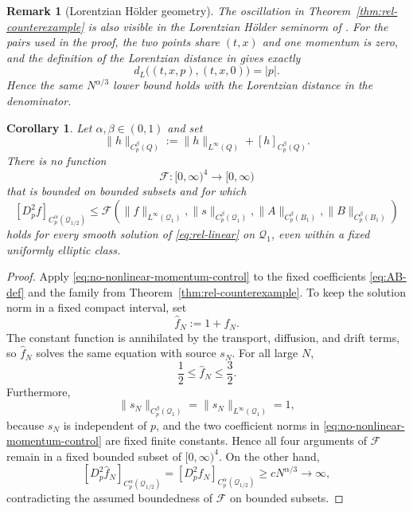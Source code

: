 \documentclass[10pt,a4paper]{amsart}
\numberwithin{equation}{section}
\newtheorem{corollary}[theorem]{Corollary}
\newtheorem{remark}[theorem]{Remark}
\begin{document}
\begin{remark}[Lorentzian H\"older geometry]\label{rem:lorentz}
The oscillation in Theorem~\ref{thm:rel-counterexample} is also visible in the Lorentzian H\"older seminorm of \cite{HSTT}.  For the pairs used in the proof, the two points share $(t,x)$ and one momentum is zero, and the definition of the Lorentzian distance in \cite[(5.6)]{HSTT} gives exactly
\[
   d_L\bigl((t,x,p),(t,x,0)\bigr)=|p|.
\]
Hence the same $N^{\alpha/3}$ lower bound holds with the Lorentzian distance in the denominator.
\end{remark}

\begin{corollary}\label{cor:no-momentum-only-nonlinear-control}
Let $\alpha,\beta\in(0,1)$ and set
\[
   \|h\|_{C_p^\beta(Q)}:=\|h\|_{L^\infty(Q)}+[h]_{C_p^\beta(Q)}.
\]
There is no function
\[
   \mathcal F:[0,\infty)^4\longrightarrow[0,\infty)
\]
that is bounded on bounded subsets and for which
\begin{equation}\label{eq:no-nonlinear-momentum-control}
   [D_p^2f]_{C_p^\alpha(\mathcal Q_{1/2})}
   \le
   \mathcal F\!\left(
      \|f\|_{L^\infty(\mathcal Q_1)},
      \|s\|_{C_p^\beta(\mathcal Q_1)},
      \|A\|_{C_p^\beta(B_1)},
      \|B\|_{C_p^\beta(B_1)}
   \right)
\end{equation}
holds for every smooth solution of \eqref{eq:rel-linear} on $\mathcal Q_1$, even within a fixed uniformly elliptic class.
\end{corollary}

\begin{proof}
Apply \eqref{eq:no-nonlinear-momentum-control} to the fixed coefficients
\eqref{eq:AB-def} and the family from Theorem~\ref{thm:rel-counterexample}.
To keep the solution norm in a fixed compact interval, set
\[
   \widehat f_N:=1+f_N.
\]
The constant function is annihilated by the transport, diffusion, and drift
terms, so $\widehat f_N$ solves the same equation with source $s_N$.  For all
large $N$,
\[
   \frac12\le \widehat f_N\le\frac32.
\]
Furthermore,
\[
   \|s_N\|_{C_p^\beta(\mathcal Q_1)}
   =\|s_N\|_{L^\infty(\mathcal Q_1)}=1,
\]
because $s_N$ is independent of $p$, and the two coefficient norms in
\eqref{eq:no-nonlinear-momentum-control} are fixed finite constants.  Hence all
four arguments of $\mathcal F$ remain in a fixed bounded subset of
$[0,\infty)^4$.  On the other hand,
\[
   [D_p^2\widehat f_N]_{C_p^\alpha(\mathcal Q_{1/2})}
   =[D_p^2f_N]_{C_p^\alpha(\mathcal Q_{1/2})}
   \ge cN^{\alpha/3}\longrightarrow\infty,
\]
contradicting the assumed boundedness of $\mathcal F$ on bounded subsets.
\end{proof}
\end{document}
